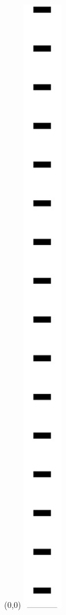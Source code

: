 %
%
\begin{titlingpage}
\begin{textblock}{2}(0,0)
  {\includegraphics{iiim/IIIM-header-stripes-vertical.eps}}

\end{textblock}
\end{titlingpage}
